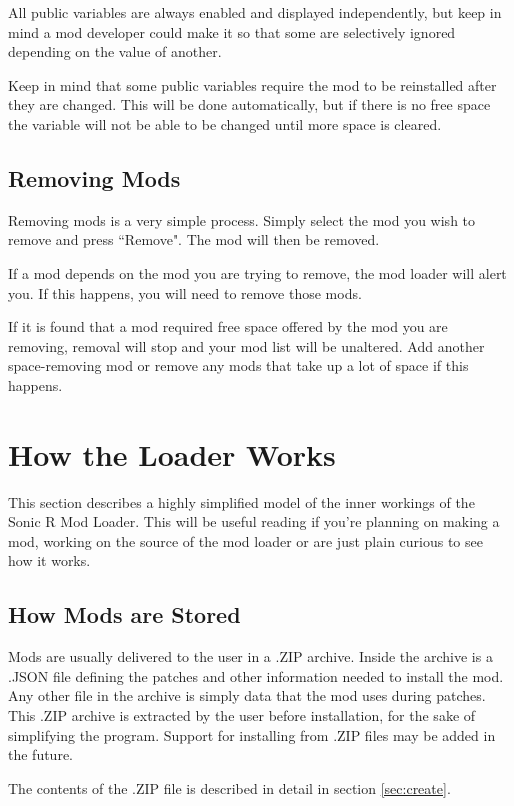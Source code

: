 \documentclass[12pt,a4paper,notitlepage]{article}
\begin{document}
All public variables are always enabled and displayed independently, but keep in mind a mod developer could make it so that some are selectively ignored depending on the value of another.

Keep in mind that some public variables require the mod to be reinstalled after they are changed. This will be done automatically, but if there is no free space the variable will not be able to be changed until more space is cleared.

\subsection{Removing Mods}
\label{subsec:using-uninstall}
Removing mods is a very simple process. Simply select the mod you wish to remove and press ``Remove". The mod will then be removed.

If a mod depends on the mod you are trying to remove, the mod loader will alert you. If this happens, you will need to remove those mods.

If it is found that a mod required free space offered by the mod you are removing, removal will stop and your mod list will be unaltered. Add another space-removing mod or remove any mods that take up a lot of space if this happens.

\pagebreak
\section{How the Loader Works}
\label{sec:works}
This section describes a highly simplified model of the inner workings of the Sonic R Mod Loader. This will be useful reading if you're planning on making a mod, working on the source of the mod loader or are just plain curious to see how it works.

\subsection{How Mods are Stored}
\label{subsec:works-store}
Mods are usually delivered to the user in a .ZIP archive. Inside the archive is a .JSON file defining the patches and other information needed to install the mod. Any other file in the archive is simply data that the mod uses during patches. This .ZIP archive is extracted by the user before installation, for the sake of simplifying the program. Support for installing from .ZIP files may be added in the future.

The contents of the .ZIP file is described in detail in section \ref{sec:create}.
\end{document}
